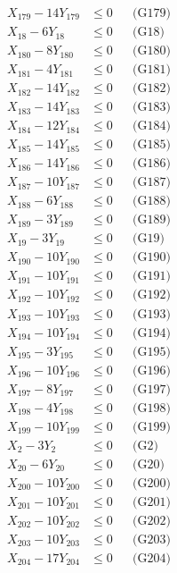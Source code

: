\documentclass[a4paper,10pt]{article}
\begin{document}
{\begin{align}
X_{179} - 14Y_{179} &\leq 0 && \text{(G179)} \\
X_{18} - 6Y_{18} &\leq 0 && \text{(G18)} \\
X_{180} - 8Y_{180} &\leq 0 && \text{(G180)} \\
X_{181} - 4Y_{181} &\leq 0 && \text{(G181)} \\
X_{182} - 14Y_{182} &\leq 0 && \text{(G182)} \\
X_{183} - 14Y_{183} &\leq 0 && \text{(G183)} \\
X_{184} - 12Y_{184} &\leq 0 && \text{(G184)} \\
X_{185} - 14Y_{185} &\leq 0 && \text{(G185)} \\
X_{186} - 14Y_{186} &\leq 0 && \text{(G186)} \\
X_{187} - 10Y_{187} &\leq 0 && \text{(G187)} \\
X_{188} - 6Y_{188} &\leq 0 && \text{(G188)} \\
\allowbreak
X_{189} - 3Y_{189} &\leq 0 && \text{(G189)} \\
X_{19} - 3Y_{19} &\leq 0 && \text{(G19)} \\
X_{190} - 10Y_{190} &\leq 0 && \text{(G190)} \\
X_{191} - 10Y_{191} &\leq 0 && \text{(G191)} \\
X_{192} - 10Y_{192} &\leq 0 && \text{(G192)} \\
X_{193} - 10Y_{193} &\leq 0 && \text{(G193)} \\
X_{194} - 10Y_{194} &\leq 0 && \text{(G194)} \\
X_{195} - 3Y_{195} &\leq 0 && \text{(G195)} \\
X_{196} - 10Y_{196} &\leq 0 && \text{(G196)} \\
X_{197} - 8Y_{197} &\leq 0 && \text{(G197)} \\
X_{198} - 4Y_{198} &\leq 0 && \text{(G198)} \\
X_{199} - 10Y_{199} &\leq 0 && \text{(G199)} \\
X_{2} - 3Y_{2} &\leq 0 && \text{(G2)} \\
X_{20} - 6Y_{20} &\leq 0 && \text{(G20)} \\
X_{200} - 10Y_{200} &\leq 0 && \text{(G200)} \\
X_{201} - 10Y_{201} &\leq 0 && \text{(G201)} \\
X_{202} - 10Y_{202} &\leq 0 && \text{(G202)} \\
X_{203} - 10Y_{203} &\leq 0 && \text{(G203)} \\
X_{204} - 17Y_{204} &\leq 0 && \text{(G204)} \\

\end{align}}
\end{document}
